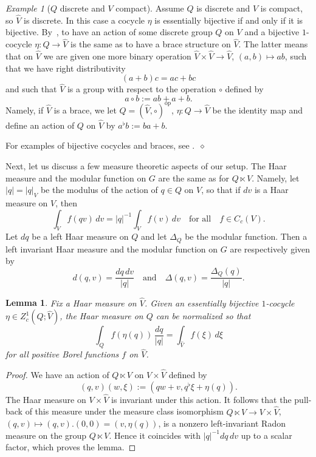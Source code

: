 \documentclass[a4paper,11pt,reqno]{amsart}
\numberwithin{equation}{section}
\newtheorem{lemma}[theorem]{Lemma}
\theoremstyle{remark}
\newtheorem{example}[theorem]{Example}
\theoremstyle{definition}
\newcommand\bp{\begin{proof}}
\newcommand\ep{\end{proof}}
\newcommand\ee{\nopagebreak\mbox{\ }\hfill$\diamond$}
\begin{document}
\begin{example}[$Q$ discrete and $V$ compact]\label{ex:dc}
Assume $Q$ is discrete and $V$ is compact, so $\hat V$ is discrete. In this case a cocycle $\eta$ is essentially bijective if and only if it is bijective. By~\cite{MR2298848}, to have an action of some discrete group $Q$ on $V$ and a bijective $1$-cocycle $\eta\colon Q\to\hat V$ is the same as to have a brace structure on $\hat V$. The latter means that on $\hat V$ we are given one more binary operation $\hat V\times\hat V\to\hat V$, $(a,b)\mapsto ab$, such that we have right distributivity
$$
(a+b)c=ac+bc
$$
and such that $\hat V$ is a group with respect to the operation $\circ$ defined by
$$
a\circ b:=ab+a+b.
$$
Namely, if $\hat V$ is a brace, we let $Q=(\hat V,\circ)^{\mathrm{op}}$, $\eta\colon Q\to\hat V$ be the identity map and define an action of $Q$ on $\hat V$ by $a^\flat b:=ba+b$.

For examples of bijective cocycles and braces, see .\ee
\end{example}

Next, let us discuss a few measure theoretic aspects of our setup. The Haar measure and the modular function on $G$ are the same as for $Q\ltimes V$. Namely, let $|q|=|q|_V$ be the modulus of the action of $q\in Q$ on $V$, so that if $dv$ is a Haar measure on $V$, then
$$
\int_V f(qv)\,dv=|q|^{-1}\int_V f(v)\,dv\quad\text{for all}\quad f\in C_c(V).
$$
Let $dq$ be a left Haar measure on $Q$ and let $\Delta_Q$  be the
modular function. Then a left invariant Haar  measure and the modular function on $G$ are respectively given by
$$
d(q,v)=\frac{dq\,dv}{|q|}\quad\mbox{and}\quad \Delta(q,v)=\frac{\Delta_Q(q)}{|q|}.
$$

\begin{lemma}\label{lem:normalization}
Fix a Haar measure on $\hat V$. Given an essentially bijective $1$-cocycle $\eta\in Z^1_c(Q;\hat V)$, the Haar measure on $Q$ can be normalized so that
$$
\int_Q f(\eta(q))\,\frac{dq}{|q|}=\int_{\hat V}f(\xi)\,d\xi
$$
for all positive Borel functions $f$ on $\hat V$.
\end{lemma}

\bp
We have an action of $Q\ltimes V$ on $V\times\hat V$ defined by
$$
(q,v)(w,\xi):=(qw+v,q^\flat\xi+\eta(q)).
$$
The Haar measure on $V\times\hat V$ is invariant under this action. It follows that the pull-back of this measure under the measure class isomorphism $Q\ltimes V\to V\times\hat V$, $(q,v)\mapsto (q,v).(0,0)=(v,\eta(q))$, is a nonzero left-invariant Radon measure on the group $Q\ltimes V$. Hence it coincides with $|q|^{-1}dq\,dv$ up to a scalar factor, which proves the lemma.
\ep
\end{document}
